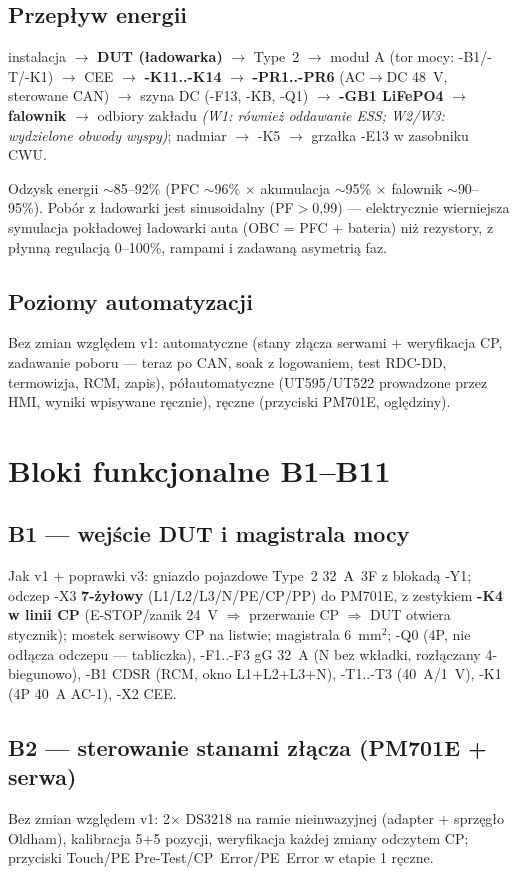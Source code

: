 \documentclass[11pt,a4paper]{article}
\begin{document}
\subsection{Przepływ energii}
\begin{center}\small
instalacja $\to$ \textbf{DUT (ładowarka)} $\to$ Type~2 $\to$ moduł A (tor mocy: -B1/-T/-K1) $\to$
CEE $\to$ \textbf{-K11..-K14} $\to$ \textbf{-PR1..-PR6} (AC$\to$DC 48~V, sterowane CAN) $\to$
szyna DC (-F13, -KB, -Q1) $\to$ \textbf{-GB1 LiFePO4} $\to$ \textbf{falownik} $\to$
odbiory zakładu \emph{(W1: również oddawanie ESS; W2/W3: wydzielone obwody wyspy)};
nadmiar $\to$ -K5 $\to$ grzałka -E13 w zasobniku CWU.
\end{center}
Odzysk energii $\sim$85--92\% (PFC $\sim$96\% $\times$ akumulacja $\sim$95\% $\times$ falownik
$\sim$90--95\%). Pobór z ładowarki jest sinusoidalny (PF$>$0,99) --- elektrycznie wierniejsza
symulacja pokładowej ładowarki auta (OBC = PFC + bateria) niż rezystory, z płynną regulacją
0--100\%, rampami i zadawaną asymetrią faz.

\subsection{Poziomy automatyzacji}
Bez zmian względem v1: automatyczne (stany złącza serwami + weryfikacja CP, zadawanie poboru ---
teraz po CAN, soak z logowaniem, test RDC-DD, termowizja, RCM, zapis), półautomatyczne (UT595/UT522
prowadzone przez HMI, wyniki wpisywane ręcznie), ręczne (przyciski PM701E, oględziny).

\section{Bloki funkcjonalne B1--B11}
\subsection{B1 --- wejście DUT i magistrala mocy}
Jak v1 + poprawki v3: gniazdo pojazdowe Type~2 32~A~3F z blokadą -Y1; odczep -X3 \textbf{7-żyłowy}
(L1/L2/L3/N/PE/CP/PP) do PM701E, z zestykiem \textbf{-K4 w linii CP} (E-STOP/zanik 24~V $\Rightarrow$
przerwanie CP $\Rightarrow$ DUT otwiera stycznik); mostek serwisowy CP na listwie; magistrala 6~mm$^2$;
-Q0 (4P, nie odłącza odczepu --- tabliczka), -F1..-F3 gG 32~A (N bez wkładki, rozłączany 4-biegunowo),
-B1 CDSR (RCM, okno L1+L2+L3+N), -T1..-T3 (40~A/1~V), -K1 (4P 40~A AC-1), -X2 CEE.
\subsection{B2 --- sterowanie stanami złącza (PM701E + serwa)}
Bez zmian względem v1: 2$\times$ DS3218 na ramie nieinwazyjnej (adapter + sprzęgło Oldham),
kalibracja 5+5 pozycji, weryfikacja każdej zmiany odczytem CP; przyciski Touch/PE Pre-Test/CP~Error/PE~Error
w etapie 1 ręczne.
\end{document}
